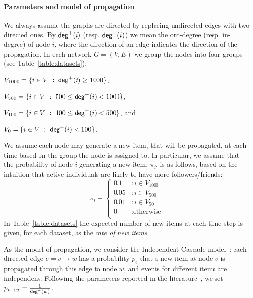 \paragraph*{Parameters and model of propagation}
 We always assume the graphs are directed by replacing undirected edges with two directed ones. By $\mathsf{deg}^+(i)$ (resp. $\mathsf{deg}^-(i)$) we mean the out-degree (resp. in-degree) of node $i$, where the direction of an edge indicates the direction of the propagation. In each network $G=(V,E)$ we group the nodes into four groups (see Table~\ref{table:datasets}):
\begin{itemize*}
 \item $V_{1000} = \{i\in V ~:~ \mathsf{deg}^+(i) \geq 1000\}$,
 \item $V_{500}  = \{i\in V ~:~ 500\leq \mathsf{deg}^+(i) < 1000\}$,
 \item $V_{100}  = \{i\in V ~:~ 100\leq \mathsf{deg}^+(i) < 500\}$, and
 \item $V_{0}    = \{i\in V ~:~ \mathsf{deg}^+(i) < 100\}$.
\end{itemize*}
We assume each node may generate a new item, that will be propagated, at each time based on the group the node is assigned to. In particular, we assume that the probability of  node $i$ generating a new item, $\pi_i$, is as follows, based on the intuition that active individuals are  likely to have more followers/friends:
$$
   \pi_i = \left\{
     \begin{array}{ll}
       0.1 &: i \in V_{1000}\\
       0.05 &: i \in V_{500} \\       
       0.01 &: i \in V_{50} \\
       0 & : \text{otherwise} \\
     \end{array}
   \right.
$$
 In Table~\ref{table:datasets} the expected number of new items at each time step is given, for each dataset, as the \emph{rate of new items}.







As the model of propagation, we consider the Independent-Cascade model~\cite{Kempe2003}:  each directed edge $e=v\rightarrow w$ has a probability $p_e$ that a new item at node $v$ is propagated through this edge to node $w$, and events for different items are independent. Following the parameters reported in the literature~\cite{Kempe2003,Chen2009,Chen2010,jung2011irie,tang2014influence}, we set $p_{v\rightarrow w} = \frac{1}{\mathsf{deg}^-(w)}$.



